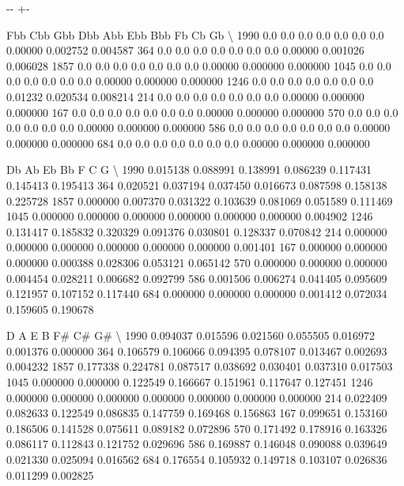 \documentclass[letterpaper,10pt,english]{sphinxmanual}
\newlength\nbsphinxcodecellspacing
\begin{document}
{

\kern-\sphinxverbatimsmallskipamount\kern-\baselineskip
\kern+\FrameHeightAdjust\kern-\fboxrule
\vspace{\nbsphinxcodecellspacing}

\begin{sphinxVerbatim}[commandchars=\\\{\}]
\llap{\color{nbsphinxout}[22]:\,\hspace{\fboxrule}\hspace{\fboxsep}}      Fbb  Cbb  Gbb  Dbb  Abb  Ebb  Bbb       Fb        Cb        Gb  \textbackslash{}
1990  0.0  0.0  0.0  0.0  0.0  0.0  0.0  0.00000  0.002752  0.004587
364   0.0  0.0  0.0  0.0  0.0  0.0  0.0  0.00000  0.001026  0.006028
1857  0.0  0.0  0.0  0.0  0.0  0.0  0.0  0.00000  0.000000  0.000000
1045  0.0  0.0  0.0  0.0  0.0  0.0  0.0  0.00000  0.000000  0.000000
1246  0.0  0.0  0.0  0.0  0.0  0.0  0.0  0.01232  0.020534  0.008214
214   0.0  0.0  0.0  0.0  0.0  0.0  0.0  0.00000  0.000000  0.000000
167   0.0  0.0  0.0  0.0  0.0  0.0  0.0  0.00000  0.000000  0.000000
570   0.0  0.0  0.0  0.0  0.0  0.0  0.0  0.00000  0.000000  0.000000
586   0.0  0.0  0.0  0.0  0.0  0.0  0.0  0.00000  0.000000  0.000000
684   0.0  0.0  0.0  0.0  0.0  0.0  0.0  0.00000  0.000000  0.000000

            Db        Ab        Eb        Bb         F         C         G  \textbackslash{}
1990  0.015138  0.088991  0.138991  0.086239  0.117431  0.145413  0.195413
364   0.020521  0.037194  0.037450  0.016673  0.087598  0.158138  0.225728
1857  0.000000  0.007370  0.031322  0.103639  0.081069  0.051589  0.111469
1045  0.000000  0.000000  0.000000  0.000000  0.000000  0.000000  0.004902
1246  0.131417  0.185832  0.320329  0.091376  0.030801  0.128337  0.070842
214   0.000000  0.000000  0.000000  0.000000  0.000000  0.000000  0.001401
167   0.000000  0.000000  0.000000  0.000388  0.028306  0.053121  0.065142
570   0.000000  0.000000  0.000000  0.004454  0.028211  0.006682  0.092799
586   0.001506  0.006274  0.041405  0.095609  0.121957  0.107152  0.117440
684   0.000000  0.000000  0.000000  0.001412  0.072034  0.159605  0.190678

             D         A         E         B        F\#        C\#        G\#  \textbackslash{}
1990  0.094037  0.015596  0.021560  0.055505  0.016972  0.001376  0.000000
364   0.106579  0.106066  0.094395  0.078107  0.013467  0.002693  0.004232
1857  0.177338  0.224781  0.087517  0.038692  0.030401  0.037310  0.017503
1045  0.000000  0.000000  0.122549  0.166667  0.151961  0.117647  0.127451
1246  0.000000  0.000000  0.000000  0.000000  0.000000  0.000000  0.000000
214   0.022409  0.082633  0.122549  0.086835  0.147759  0.169468  0.156863
167   0.099651  0.153160  0.186506  0.141528  0.075611  0.089182  0.072896
570   0.171492  0.178916  0.163326  0.086117  0.112843  0.121752  0.029696
586   0.169887  0.146048  0.090088  0.039649  0.021330  0.025094  0.016562
684   0.176554  0.105932  0.149718  0.103107  0.026836  0.011299  0.002825


\end{sphinxVerbatim}}
\end{document}
